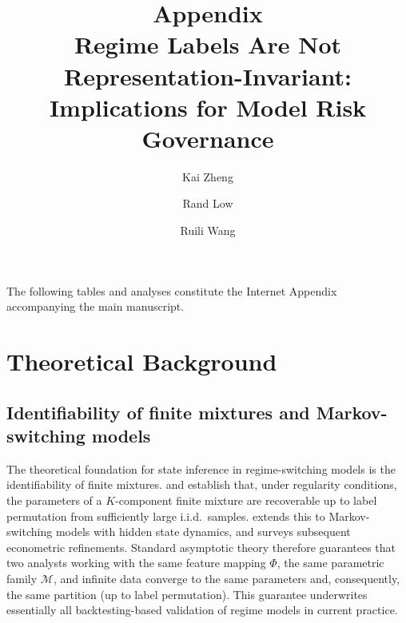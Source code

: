 \documentclass[preprint,12pt,authoryear]{elsarticle}
\def\corref#1{}%
\begin{document}
\begin{frontmatter}
\sloppy

\title{{\large Appendix}\\[8pt] Regime Labels Are Not Representation-Invariant:\\ Implications for Model Risk Governance}

\author[1]{Kai Zheng}
\author[2]{Rand Low}
\author[1]{Ruili Wang\corref{cor1}}




\end{frontmatter}
\sloppy

\renewcommand{\thesection}{S\arabic{section}}
\renewcommand{\thetable}{S\arabic{table}}
\renewcommand{\thefigure}{S\arabic{figure}}
\renewcommand{\theequation}{S\arabic{equation}}

The following tables and analyses constitute the Internet Appendix accompanying the main manuscript.

\section{Theoretical Background}
\label{app:theory}

\subsection{Identifiability of finite mixtures and Markov-switching models}

The theoretical foundation for state inference in regime-switching models is the identifiability of finite mixtures. \citet{Teicher1963} and \citet{YakowitzSpragins1968} establish that, under regularity conditions, the parameters of a $K$-component finite mixture are recoverable up to label permutation from sufficiently large i.i.d.\ samples. \citet{Hamilton1989} extends this to Markov-switching models with hidden state dynamics, and \citet{Guidolin2011} surveys subsequent econometric refinements. Standard asymptotic theory therefore guarantees that two analysts working with the same feature mapping $\Phi$, the same parametric family $\mathcal{M}$, and infinite data converge to the same parameters and, consequently, the same partition (up to label permutation). This guarantee underwrites essentially all backtesting-based validation of regime models in current practice.
\end{document}
